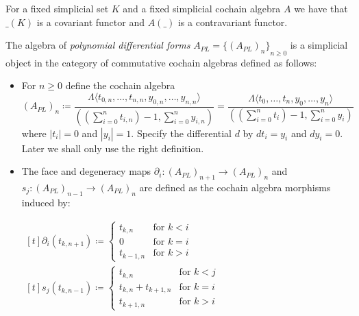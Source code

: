  \begin{Remark}
  For a fixed simplicial set $K$ and a fixed simplicial cochain algebra $A$ we have that $\_(K)$ is a covariant functor and
  $A(\_)$ is a contravariant functor.
 \end{Remark}

 \begin{Definition}
  The algebra of \emph{polynomial differential forms} $A_{PL} = {\lbrace (A_{PL})_n\rbrace}_{n \geq 0}$ is a
  simplicial object in the category of commutative cochain algebras defined as follows: \newline
  \begin{itemize}
   \item For $n \geq 0$ define the cochain algebra 
      $$(A_{PL})_n \coloneqq \frac{\Lambda \langle t_{0,n}, \dotsc, t_{n,n}, y_{0,n}, \dotsc, y_{n,n} \rangle}
      {((\sum_{i = 0}^n t_{i,n}) - 1, \sum_{i = 0}^n y_{i,n})}
      = \frac{\Lambda \langle t_0, \dotsc, t_n, y_0, \dotsc, y_n \rangle}
      {((\sum_{i = 0}^n t_i) - 1, \sum_{i = 0}^n y_i)} $$
      where $|t_i| = 0$ and $|y_i| = 1$. Specify the differential $d$ by $dt_i = y_i$ and $dy_i = 0$. Later we shall only use the right
      definition.
   \item The face and degeneracy maps 
   $ \partial_i \colon (A_{PL})_{n+1} \to (A_{PL})_n$ and $ s_j \colon (A_{PL})_{n-1} \to (A_{PL})_n$
   are defined as the cochain algebra morphisms induced by:
   
    \begin{center}
      \hfill
      $\!\begin{aligned}[t]
       \partial_i (t_{k,n+1}) \coloneqq \begin{cases}
                                      t_{k,n}  	&\text{for $k < i$} \\
                                      0		&\text{for $k = i$}\\
                                      t_{k-1,n} &\text{for $k > i$}
				      \end{cases}
      \end{aligned}$\hfill\hfill
      $\!\begin{aligned}[t]
       s_j (t_{k,n-1}) \coloneqq \begin{cases}
                                      t_{k,n}  			&\text{for $k < j$} \\
                                      t_{k,n} + t_{k+1,n}	&\text{for $k = i$}\\
                                      t_{k+1,n} 		&\text{for $k > i$}
				      \end{cases}
      \end{aligned}$\hfill
    \end{center}    
  \end{itemize}
 \end{Definition}

